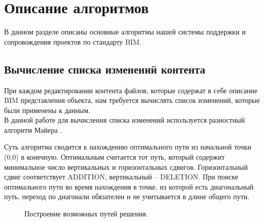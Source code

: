 \documentclass[a4paper,14pt]{extreport} %
\begin{document}
\newpage
\section{Описание алгоритмов}
В данном разделе описаны основные алгоритмы нашей системы поддержки и сопровождения проектов по стандарту BIM.

\subsection{Вычисление списка изменений контента} 
При каждом редактировании контента файлов, которые содержат в себе описание BIM представления объекта, нам требуется вычислять список изменений, которые были применены к данным. \\
В данной работе для вычисления списка изменений используется разностный алгоритм Майера \cite{MYERS_ALGO}.

Суть алгоритма сводится к нахождению оптимального пути из начальной точки (0,0) в конечную. Оптимальным считается тот путь, который содержит минимальное число вертикальных и горизонтальных сдвигов. Горизонтальный сдвиг соответствует ADDITION, вертикальный -- DELETION. При поиске оптимального пути во время нахождения в точке, из которой есть диагональный путь, переход по диагонали обязателен и не учитывается в длине общего пути.

\begin{figure}[H]
\caption{Построение возможных путей решения.}
\label{myers-diff-algo}
\end{figure}
\end{document}
